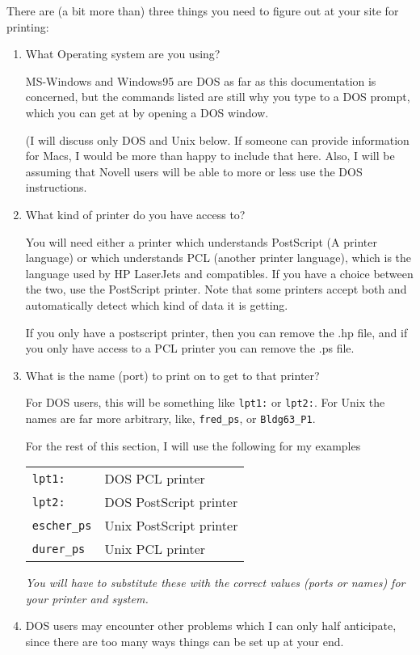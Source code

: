 \documentclass[%
	11pt,
        a4paper,
        twoside]{workrep}
\newcommand*{\file}[1]{\texttt{#1}}		%
\begin{document}
There are (a bit more than) three things you need to figure out
at your site for printing:
\begin{enumerate}

\item    What Operating system are you using?
  
         MS-Windows and Windows95 are DOS as far as this documentation
	 is concerned, but the commands listed are still why you type
	 to a DOS prompt, which you can get at by opening a DOS window.

         (I will discuss only
	 DOS and Unix below.  If someone can provide information for
	 Macs, I would be more than happy to include that here.  Also,
	 I will be assuming that Novell users will be able to more
	 or less use the DOS instructions.


\item    What kind of printer do you have access to?

         You will need either a printer
	 which understands PostScript (A printer language) or
	 which understands PCL (another printer language), which
	 is the language used by HP LaserJets and compatibles.  If
	 you have a choice between the two, use the PostScript printer.
	 Note that some printers accept both and automatically detect
	 which kind of data it is getting.

         If you only have a postscript printer, then you can remove
         the .hp file, and if you only have access to a PCL printer
	 you can remove the .ps file.  

\item\label{en:print:name}
         What is the name (port) to print on to get to that printer?

	 For DOS users, this will be something like \file{lpt1:} or
	 \file{lpt2:}.  For Unix the names are far more arbitrary,
	 like, \file{fred\_ps}, or \file{Bldg63\_P1}.

         For the rest of this section,
         I will use the following for my examples
	 \begin{center}
	 \begin{tabular}{ll}
	   \file{lpt1:} & DOS PCL printer\\
	   \file{lpt2:} & DOS PostScript printer\\
	   \file{escher\_ps} & Unix PostScript printer\\
	   \file{durer\_ps} & Unix PCL printer
	 \end{tabular}
	 \end{center}
	 \emph{You will have to substitute
	 these with the correct values (ports or names)
         for your printer and system.}
	 
\item	 DOS users may encounter other problems which I can only
	 half anticipate, since there are too many ways things can
	 be set up at your end.
\end{enumerate}
\end{document}
